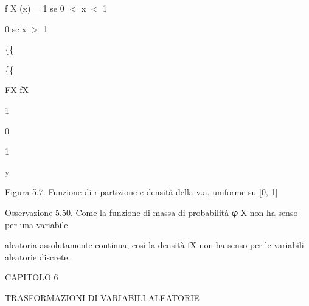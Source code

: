 \documentclass[a4paper,portrait,12pt]{article}
\begin{document}
\begin{flushleft}
f X (x) = 1 se 0 $<$ x $<$ 1
\end{flushleft}


\begin{flushleft}
0 se x $>$ 1
\end{flushleft}





\{\{


\{\{





\begin{flushleft}
FX fX
\end{flushleft}


1





0





1





\begin{flushleft}
y
\end{flushleft}





\begin{flushleft}
Figura 5.7. Funzione di ripartizione e densit\`{a} della v.a. uniforme su [0, 1]
\end{flushleft}





\begin{flushleft}
Osservazione 5.50. Come la funzione di massa di probabilit\`{a} 𝜑 X non ha senso per una variabile
\end{flushleft}


\begin{flushleft}
aleatoria assolutamente continua, così la densit\`{a} fX non ha senso per le variabili aleatorie discrete.
\end{flushleft}





\begin{flushleft}
\newpage
CAPITOLO 6
\end{flushleft}


\begin{flushleft}
TRASFORMAZIONI DI VARIABILI ALEATORIE
\end{flushleft}
\end{document}
